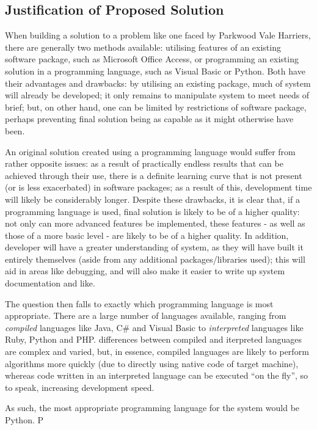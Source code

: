 \documentclass{article}[12pt,a4paper]
\begin{document}
\subsection{Justification of Proposed Solution}
When building a solution to a problem like one faced by Parkwood Vale Harriers, there are generally two methods available: utilising features of an existing software package, such as Microsoft Office Access, or programming an existing solution in a programming language, such as Visual Basic or Python. Both have their advantages and drawbacks: by utilising an existing package, much of system will already be developed; it only remains to manipulate system to meet needs of brief; but, on other hand, one can be limited by restrictions of software package, perhaps preventing final solution being as capable as it might otherwise have been.

An original solution created using a programming language would suffer from rather opposite issues: as a result of practically endless results that can be achieved through their use, there is a definite learning curve that is not present (or is less exacerbated) in software packages; as a result of this, development time will likely be considerably longer. Despite these drawbacks, it is clear that, if a programming language is used, final solution is likely to be of a higher quality: not only can more advanced features be implemented, these features - as well as those of a more basic level - are likely to be of a higher quality.  In addition, developer will have a greater understanding of system, as they will have built it entirely themselves (aside from any additional packages/libraries used); this will aid in areas like debugging, and will also make it easier to write up system documentation and like.

The question then falls to exactly which programming language is most appropriate. There are a large number of languages available, ranging from \textit{compiled} languages like Java, C\# and Visual Basic to \textit{interpreted} languages like Ruby, Python and PHP. differences between compiled and iterpreted languages are complex and varied, but, in essence, compiled languages are likely to perform algorithms more quickly (due to directly using native code of target machine), whereas code written in an interpreted language can be executed ``on the fly'', so to speak, increasing development speed. 

As such, the most appropriate programming language for the system would be Python. P
\end{document}
